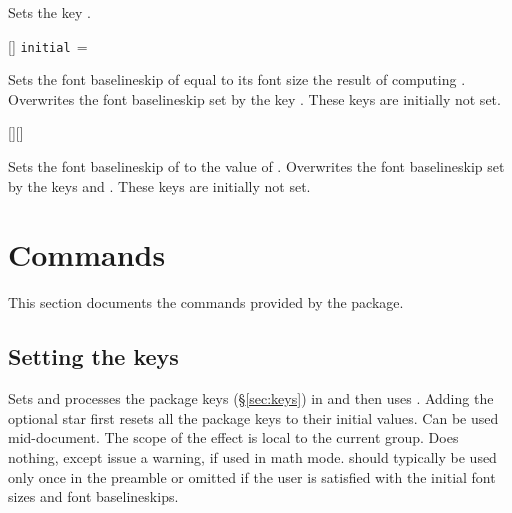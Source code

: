 \documentclass{beery}
\begin{document}
Sets the key .

\begin{displaycode}
    []%
  \newline
  \hspace*{\fill}\texttt{initial$\,=\,$}
\end{displaycode}

Sets the font baselineskip of  equal to its font size \texttimes{} the result of computing .
Overwrites the font baselineskip set by the key .
These keys are initially not set.

\begin{displaycode}
  [][]
\end{displaycode}

Sets the font baselineskip of  to the value of .
Overwrites the font baselineskip set by the keys  and .
These keys are initially not set.


\section{Commands}
\label{sec:commands}

This section documents the commands provided by the  package.

\subsection{Setting the keys}
\label{subsec:fontscalesetup}

\begin{displaycode}
   \sarg{} 
\end{displaycode}

Sets and processes the  package keys (\S\ref{sec:keys}) in  and then uses .
Adding the optional star \sarg{} first resets all the  package keys to their initial values.
Can be used mid-document.
The scope of the effect is local to the current group.
Does nothing, except issue a warning, if used in math mode.
 should typically be used only once in the preamble or omitted if the user is satisfied with the initial font sizes and font baselineskips.
\end{document}
